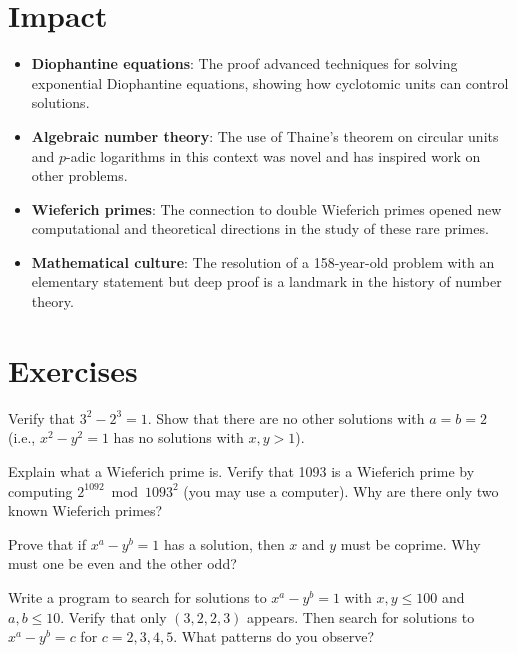 \section{Impact}

\begin{itemize}
\item \textbf{Diophantine equations}: The proof advanced techniques for solving exponential Diophantine equations, showing how cyclotomic units can control solutions.
\item \textbf{Algebraic number theory}: The use of Thaine's theorem on circular units and $p$-adic logarithms in this context was novel and has inspired work on other problems.
\item \textbf{Wieferich primes}: The connection to double Wieferich primes opened new computational and theoretical directions in the study of these rare primes.
\item \textbf{Mathematical culture}: The resolution of a 158-year-old problem with an elementary statement but deep proof is a landmark in the history of number theory.
\end{itemize}

\section{Exercises}

\begin{exercise}[Basic]
Verify that $3^2 - 2^3 = 1$. Show that there are no other solutions with $a = b = 2$ (i.e., $x^2 - y^2 = 1$ has no solutions with $x, y > 1$).
\end{exercise}

\begin{exercise}[Intermediate]
Explain what a Wieferich prime is. Verify that 1093 is a Wieferich prime by computing $2^{1092} \bmod 1093^2$ (you may use a computer). Why are there only two known Wieferich primes?
\end{exercise}

\begin{exercise}[Challenge]
Prove that if $x^a - y^b = 1$ has a solution, then $x$ and $y$ must be coprime. Why must one be even and the other odd?
\end{exercise}

\begin{exercise}
Write a program to search for solutions to $x^a - y^b = 1$ with $x, y \leq 100$ and $a, b \leq 10$. Verify that only $(3, 2, 2, 3)$ appears. Then search for solutions to $x^a - y^b = c$ for $c = 2, 3, 4, 5$. What patterns do you observe?
\end{exercise}

